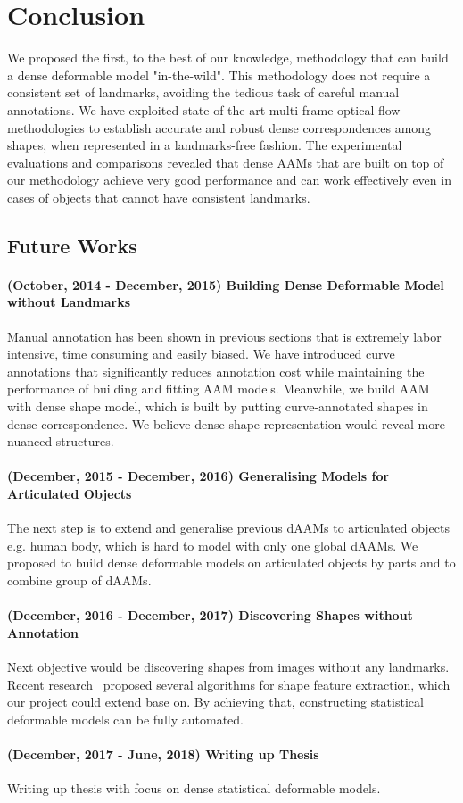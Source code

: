 \chapter{Conclusion}
\label{ch:conclusions}

We proposed the first, to the best of our knowledge, methodology that can build a dense deformable model "in-the-wild". This methodology does not require a consistent set of landmarks, avoiding the tedious task of careful manual annotations. We have exploited state-of-the-art multi-frame optical flow methodologies to establish accurate and robust dense correspondences among shapes, when represented in a landmarks-free fashion. The experimental evaluations and comparisons revealed that dense AAMs that are built on top of our methodology achieve very good performance and can work effectively even in cases of objects that cannot have consistent landmarks.

\section{Future Works}

\subsubsection{(October, 2014 - December, 2015) Building Dense Deformable Model without Landmarks} 
Manual annotation has been shown in previous sections that is extremely labor intensive, time consuming and easily biased. We have introduced curve annotations that significantly reduces annotation cost while maintaining the performance of building and fitting AAM models. Meanwhile, we build AAM with dense shape model, which is built by putting curve-annotated shapes in dense correspondence. We believe dense shape representation would reveal more nuanced structures.

\subsubsection{(December, 2015 - December, 2016) Generalising Models for Articulated Objects}
The next step is to extend and generalise previous dAAMs to articulated objects e.g. human body, which is hard to model with only one global dAAMs. We proposed to build dense deformable models on articulated objects by parts and to combine group of dAAMs.

\subsubsection{(December, 2016 - December, 2017) Discovering Shapes without Annotation}
Next objective would be discovering shapes from images without any landmarks. Recent research~\cite{zhou2015flowweb, jia2014roml, jiang2009learning} proposed several algorithms for shape feature extraction, which our project could extend base on. By achieving that, constructing statistical deformable models can be fully automated.

\subsubsection{(December, 2017 - June, 2018) Writing up Thesis}
Writing up thesis with focus on dense statistical deformable models.